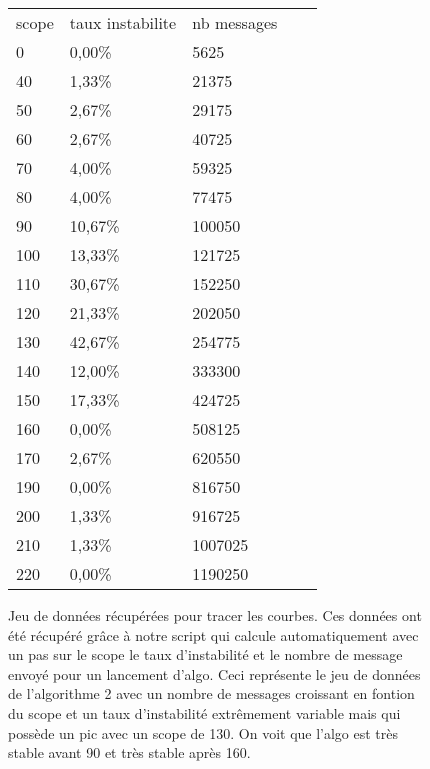 \documentclass[11pt,a4paper,sans]{report}
\begin{document}
	\begin{figure}[H]
		\centering
		\begin{tabular}{lllll}
			scope & taux instabilite & nb messages &  &  \\
			0     & 0,00\%           & 5625        &  &  \\
			40    & 1,33\%           & 21375       &  &  \\
			50    & 2,67\%           & 29175       &  &  \\
			60    & 2,67\%           & 40725       &  &  \\
			70    & 4,00\%           & 59325       &  &  \\
			80    & 4,00\%           & 77475       &  &  \\
			90    & 10,67\%          & 100050      &  &  \\
			100   & 13,33\%          & 121725      &  &  \\
			110   & 30,67\%          & 152250      &  &  \\
			120   & 21,33\%          & 202050      &  &  \\
			130   & 42,67\%          & 254775      &  &  \\
			140   & 12,00\%          & 333300      &  &  \\
			150   & 17,33\%          & 424725      &  &  \\
			160   & 0,00\%           & 508125      &  &  \\
			170   & 2,67\%           & 620550      &  &  \\
			190   & 0,00\%           & 816750      &  &  \\
			200   & 1,33\%           & 916725      &  &  \\
			210   & 1,33\%           & 1007025     &  &  \\
			220   & 0,00\%           & 1190250     &  &
		\end{tabular}

		\caption{Jeu de données récupérées pour tracer les courbes. Ces données ont été récupéré grâce à notre script qui calcule automatiquement avec un pas sur le scope le taux d'instabilité et le nombre de message envoyé pour un lancement d'algo. Ceci représente le jeu de données de l'algorithme 2 avec un nombre de messages croissant en fontion du scope et un taux d'instabilité extrêmement variable mais qui possède un pic avec un scope de 130. On voit que l'algo est très stable avant 90 et très stable après 160.}
	\end{figure}
\end{document}
